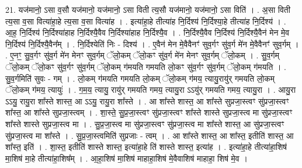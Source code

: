 \documentclass[17pt]{extarticle}
\begin{document}
21. यज॑मानो॒ ऽसा व॒सौ यज॑मानो॒ यज॑मानो॒ ऽसा विती त्य॒सौ यज॑मानो॒ यज॑मानो॒ ऽसा विति॑ । . अ॒सा विती त्य॒सा व॒सा वित्या॑हा॒हे त्य॒सा व॒सा वित्या॑ह । . इत्या॑हा॒हे तीत्या॑ह नि॒र्दिश्य॑ नि॒र्दिश्या॒हे तीत्या॑ह नि॒र्दिश्य॑ । . आ॒ह॒ नि॒र्दिश्य॑ नि॒र्दिश्या॑हाह नि॒र्दिश्यै॒वैव नि॒र्दिश्या॑हाह नि॒र्दिश्यै॒व । . नि॒र्दिश्यै॒वैव नि॒र्दिश्य॑ नि॒र्दिश्यै॒वैन॑ मेन मे॒व नि॒र्दिश्य॑ नि॒र्दिश्यै॒वैन᳚म् । . नि॒र्दिश्येति॑ निः - दिश्य॑ । . ए॒वैन॑ मेन मे॒वैवैनꣳ॑ सुव॒र्गꣳ सु॑व॒र्ग मे॑न मे॒वैवैनꣳ॑ सुव॒र्गम् । . ए॒नꣳ॒॒ सु॒व॒र्गꣳ सु॑व॒र्ग मे॑न मेनꣳ सुव॒र्गम् ॅलो॒कम् ॅलो॒कꣳ सु॑व॒र्ग मे॑न मेनꣳ सुव॒र्गम् ॅलो॒कम् । . सु॒व॒र्गम् ॅलो॒कम् ॅलो॒कꣳ सु॑व॒र्गꣳ सु॑व॒र्गम् ॅलो॒कम् ग॑मयति गमयति लो॒कꣳ सु॑व॒र्गꣳ सु॑व॒र्गम् ॅलो॒कम् ग॑मयति । . सु॒व॒र्गमिति॑ सुवः - गम् । . लो॒कम् ग॑मयति गमयति लो॒कम् ॅलो॒कम् ग॑मय॒ त्यायु॒रायु॑र् गमयति लो॒कम् ॅलो॒कम् ग॑मय॒ त्यायुः॑ । . ग॒म॒य॒ त्यायु॒ रायु॑र् गमयति गमय॒ त्यायु॒रा ऽऽयु॑र् गमयति गमय॒ त्यायु॒रा । . आयु॒रा ऽऽयु॒ रायु॒रा शा᳚स्ते शास्त॒ आ ऽऽयु॒ रायु॒रा शा᳚स्ते । . आ शा᳚स्ते शास्त॒ आ शा᳚स्ते सुप्रजा॒स्त्वꣳ सु॑प्रजा॒स्त्वꣳ शा᳚स्त॒ आ शा᳚स्ते सुप्रजा॒स्त्वम् । . शा॒स्ते॒ सु॒प्र॒जा॒स्त्वꣳ सु॑प्रजा॒स्त्वꣳ शा᳚स्ते शास्ते सुप्रजा॒स्त्व मा सु॑प्रजा॒स्त्वꣳ शा᳚स्ते शास्ते सुप्रजा॒स्त्व मा । . सु॒प्र॒जा॒स्त्व मा सु॑प्रजा॒स्त्वꣳ सु॑प्रजा॒स्त्व मा शा᳚स्ते शास्त॒ आ सु॑प्रजा॒स्त्वꣳ सु॑प्रजा॒स्त्व मा शा᳚स्ते । . सु॒प्र॒जा॒स्त्वमिति॑ सुप्रजाः - त्वम् । . आ शा᳚स्ते शास्त॒ आ शा᳚स्त॒ इतीति॑ शास्त॒ आ शा᳚स्त॒ इति॑ । . शा॒स्त॒ इतीति॑ शास्ते शास्त॒ इत्या॑हा॒हे ति॑ शास्ते शास्त॒ इत्या॑ह । . इत्या॑हा॒हे तीत्या॑हा॒शिष॑ मा॒शिष॑ मा॒हे तीत्या॑हा॒शिष᳚म् । . आ॒हा॒शिष॑ मा॒शिष॑ माहाहा॒शिष॑ मे॒वैवाशिष॑ माहाहा॒ शिष॑ मे॒व । \newline
\end{document}

